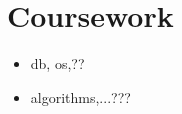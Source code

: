\documentclass[a4,12pt]{article}
\newenvironment{zitemize}{
\begin{itemize}\itemsep0pt \parskip0pt \parsep1pt}
{\end{itemize}\vspace{-0.5cm}}
\begin{document}
\section{\textbf{Coursework}}
\begin{zitemize}
    \item db, os,??
    \item algorithms,...???
\end{zitemize}







\end{document}
